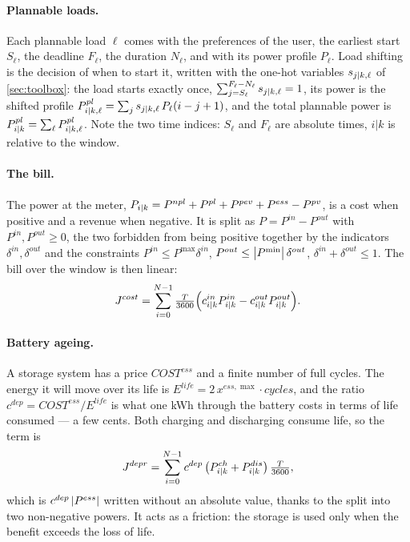 \paragraph{Plannable loads.} Each plannable load $\ell$ comes with the preferences of the user,
the earliest start $S_\ell$, the deadline $F_\ell$, the duration $N_\ell$, and with its power
profile $P_\ell$. Load shifting is the decision of when to start it, written with the one-hot
variables $s_{{j|k},\ell}$ of \cref{sec:toolbox}: the load starts exactly once,
$\sum_{j=S_\ell}^{F_\ell - N_\ell} s_{{j|k},\ell} = 1$, its power is the shifted profile
$P^{pl}_{{i|k},\ell} = \sum_j s_{{j|k},\ell}\,P_\ell(i-j+1)$, and the total plannable power is
$P^{pl}_{{i|k}} = \sum_\ell P^{pl}_{{i|k},\ell}$. Note the two time indices: $S_\ell$ and
$F_\ell$ are absolute times, $i|k$ is relative to the window.

\paragraph{The bill.} The power at the meter, $P_{{i|k}} = P^{npl} + P^{pl} + P^{pev} + P^{ess}
- P^{pv}$, is a cost when positive and a revenue when negative. It is split as $P = P^{in} -
P^{out}$ with $P^{in}, P^{out} \ge 0$, the two forbidden from being positive together by the
indicators $\delta^{in}, \delta^{out}$ and the constraints $P^{in} \le P^{\max}\delta^{in}$,
$P^{out} \le \left\lvert P^{\min} \right\rvert\delta^{out}$, $\delta^{in} + \delta^{out} \le 1$. The bill over the
window is then linear:
\begin{equation}
  J^{cost} = \sum_{i=0}^{N-1} \tfrac{T}{3600}\Big(c^{in}_{{i|k}} P^{in}_{{i|k}} - c^{out}_{{i|k}} P^{out}_{{i|k}}\Big).
\end{equation}

\paragraph{Battery ageing.} A storage system has a price $COST^{ess}$ and a finite number of
full cycles. The energy it will move over its life is $E^{life} = 2\,x^{ess,\max}\cdot
\mathit{cycles}$, and the ratio $c^{dep} = COST^{ess}/E^{life}$ is what one kWh through the
battery costs in terms of life consumed --- a few cents. Both charging and discharging consume
life, so the term is
\begin{equation}
  J^{depr} = \sum_{i=0}^{N-1} c^{dep}\,\big(P^{ch}_{{i|k}} + P^{dis}_{{i|k}}\big)\,\tfrac{T}{3600},
\end{equation}
which is $c^{dep}\left\lvert P^{ess} \right\rvert$ written without an absolute value, thanks to the split into two
non-negative powers. It acts as a friction: the storage is used only when the benefit exceeds
the loss of life.

